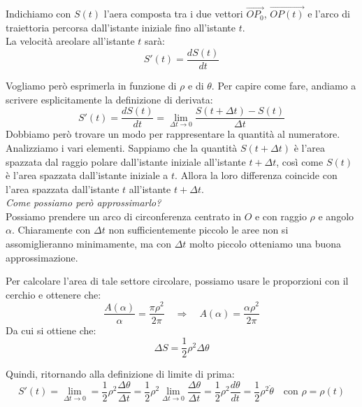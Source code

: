 \documentclass[11pt,a4paper,twoside]{article}
\theoremstyle{definition}
\begin{document}
Indichiamo con $S(t)$ l'aera composta tra i due vettori $\overrightarrow{OP_0}$, $\overrightarrow {OP(t)}$ e l'arco di traiettoria percorsa dall'istante iniziale fino all'istante $t$.\\
La velocità areolare all'istante $t$ sarà:
\[ S'(t) = \frac{dS(t)}{dt} \]

Vogliamo però esprimerla in funzione di $\rho$ e di $\theta$. Per capire come fare, andiamo a scrivere esplicitamente la definizione di derivata:
\[ S'(t) = \frac{dS(t)}{dt} = \lim_{\Delta t \to 0} \frac{S(t+ \Delta t)-S(t)}{\Delta t} \]
Dobbiamo però trovare un modo per rappresentare la quantità al numeratore. Analizziamo i vari elementi.
Sappiamo che la quantità $S(t + \Delta t)$ è l'area spazzata dal raggio polare dall'istante iniziale all'istante $t + \Delta t$, così come $S(t)$ è l'area spazzata dall'istante iniziale a $t$. Allora la loro differenza coincide con l'area spazzata dall'istante $t$ all'istante $t + \Delta t$.\\
\textit{Come possiamo però approssimarlo?}\\
Possiamo prendere un arco di circonferenza centrato in $O$ e con raggio $\rho$ e angolo $\alpha$. Chiaramente con $\Delta t$ non sufficientemente piccolo le aree non si assomiglieranno minimamente, ma con $\Delta t$ molto piccolo otteniamo una buona approssimazione.

\begin{center}
\end{center}

Per calcolare l'area di tale settore circolare, possiamo usare le proporzioni con il cerchio  e ottenere che:
\[ \frac{A(\alpha)}{\alpha} = \frac{\pi \rho^2}{2 \pi} \quad \Rightarrow \quad A(\alpha) = \frac{\alpha \rho^2}{2 \pi} \]
Da cui si ottiene che:
\[ \Delta S = \frac 12 \rho^2 \Delta \theta\]

Quindi, ritornando alla definizione di limite di prima:
\[ S'(t) = \lim_{\Delta t \to 0} = \frac 12 \rho^2 \frac{\Delta \theta}{\Delta t} = \frac 12 \rho^2 \lim_{\Delta t \to 0} \frac{\Delta \theta}{\Delta t} = \frac 12 \rho^2 \frac{d\theta}{dt} = \frac 12 \rho^2 \dot \theta \quad \text{con }\rho = \rho(t) \]
\end{document}
